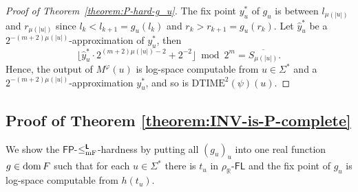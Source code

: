 \documentclass[conference]{IEEEtran}
\newcommand{\R}{\mathbb R}
\newcommand{\classonefont}[1]{\mathsf{#1}}
\newcommand{\classFL}{\classonefont{FL}}
\newcommand{\classFP}{\classonefont{FP}}
\newcommand{\classtwofont}[1]{\text{\bfseries \sffamily \upshape #1}}
\newcommand{\classLtwo}{\classtwofont{L}}
\newcommand{\rhoR}{\rho _\R}
\newcommand{\redmF}{\leq _{\mathrm{mF}}}
\newcommand{\redLmF}{\redmF ^{\classLtwo}}
\newcommand{\probDTIMEtwo}{\mathrm{DTIME}^2}
\newcommand{\dom}{\mathop{\rm dom}}
\theoremstyle{definition}
\theoremstyle{remark}
\begin{document}
\begin{proof}[Proof of Theorem~\ref{theorem:P-hard-g_u}]
 The fix point $y^*_u$ of $g_u$ is between $l_{\mu(|u|)}$ and $r_{\mu(|u|)}$ 
 since $l_k < l_{k+1} = g_u(l_k)$ and $r_k > r_{k+1} = g_u(r_k)$.
 Let $\hat y^*_u$ be a $2^{-(m+2)\mu(|u|)}$-approximation of $y^*_u$, then
\begin{equation}
 \lfloor \hat y^*_u \cdot 2^{(m+2)\mu(|u|)-2} + 2^{-2}\rfloor  \bmod 2^m
  =
  \overline{S_{\mu(|u|)}}.
\end{equation}
 Hence, the output of $M^\varphi(u)$ is log-space computable from 
 $u \in \varSigma^*$ and a $2^{-(m+2)\mu(|u|)}$-approximation $y^*_u$, and so is
 $\probDTIMEtwo(\psi)(u)$.
\end{proof}


\subsection{Proof of Theorem \ref{theorem:INV-is-P-complete}}
\label{section:proofs-of-theorems}

We show the $\classFP$-$\redLmF$-hardness 
by putting all $(g_u)_u$ into one real function $g \in \dom F$
such that for each $u \in \varSigma^*$ there is 
$t_u$ in $\rhoR$-$\classFL$ 
and the fix point of $g_u$ is log-space computable from $h(t_u)$.
\end{document}

